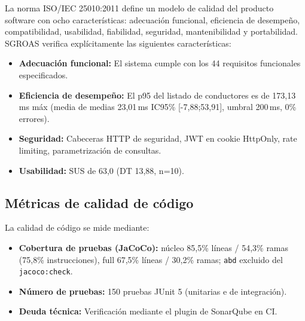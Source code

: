 La norma ISO/IEC 25010:2011 \cite{iso25010} define un modelo de calidad del producto software con ocho características: adecuación funcional, eficiencia de desempeño, compatibilidad, usabilidad, fiabilidad, seguridad, mantenibilidad y portabilidad. SGROAS verifica explícitamente las siguientes características:
\begin{itemize}
  \item \textbf{Adecuación funcional:} El sistema cumple con los 44 requisitos funcionales especificados.
  \item \textbf{Eficiencia de desempeño:} El p95 del listado de conductores es de 173,13\,ms máx (media de medias 23,01\,ms IC95\% [-7,88;53,91], umbral 200\,ms, 0\% errores).
  \item \textbf{Seguridad:} Cabeceras HTTP de seguridad, JWT en cookie HttpOnly, rate limiting, parametrización de consultas.
  \item \textbf{Usabilidad:} SUS de 63,0 (DT 13,88, n=10).
\end{itemize}

\subsection{Métricas de calidad de código}
\label{sec:code-quality}

La calidad de código se mide mediante:
\begin{itemize}
  \item \textbf{Cobertura de pruebas (JaCoCo):} núcleo 85,5\% líneas / 54,3\% ramas (75,8\% instrucciones), full 67,5\% líneas / 30,2\% ramas; \texttt{abd} excluido del \texttt{jacoco:check}.
  \item \textbf{Número de pruebas:} 150 pruebas JUnit 5 (unitarias e de integración).
  \item \textbf{Deuda técnica:} Verificación mediante el plugin de SonarQube en CI.
\end{itemize}
